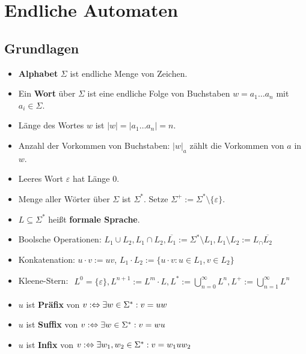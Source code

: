 
\chapter{Endliche Automaten}
\section{Grundlagen}

\begin{itemize}
	\item \textbf{Alphabet} $\Sigma$ ist endliche Menge von Zeichen.
	\item Ein \textbf{Wort} über $\Sigma$ ist eine endliche Folge von Buchstaben $w=a_1\ldots a_n$ mit $a_i\in\Sigma$.
	\item Länge des Wortes $w$ ist $|w|=|a_1\ldots a_n|=n$.
	\item Anzahl der Vorkommen von Buchstaben: $|w|_a$ zählt die Vorkommen von $a$ in $w$.
	\item Leeres Wort $\varepsilon$ hat Länge 0.
	\item Menge aller Wörter über $\Sigma$ ist $\Sigma^\ast$. Setze $\Sigma^+:=\Sigma^\ast\setminus\lbrace\varepsilon\rbrace$.
	\item $L\subseteq\Sigma^\ast$ heißt \textbf{formale Sprache}.
	\item Boolsche Operationen: $L_1\cup L_2,L_1\cap L_2,\overline{L_1}:=\Sigma^\ast\setminus L_1,L_1\setminus L_2:=L_\cap\overline{L_2}$
	\item Konkatenation: $u\cdot v:=uv$, $L_1\cdot L_2:=\big\lbrace u\cdot v:u\in L_1,v\in L_2\big\rbrace$
	\item Kleene-Stern: $
	\begin{aligned}
		L^0=\lbrace\varepsilon\rbrace,L^{n+1}:=L^m\cdot L,L^\ast:=\bigcup\limits_{n=0}^\infty L^n, L^+:=\bigcup\limits_{n=1}^\infty L^n
	\end{aligned}$
	\item $u$ ist \textbf{Präfix} von $v:\Leftrightarrow\exists w\in\Sigma^\ast:v=uw$
	\item $u$ ist \textbf{Suffix} von $v:\Leftrightarrow\exists w\in\Sigma^\ast:v=wu$
	\item $u$ ist \textbf{Infix} von $v:\Leftrightarrow\exists w_1,w_2\in\Sigma^\ast:v=w_1 uw_2$
\end{itemize}

